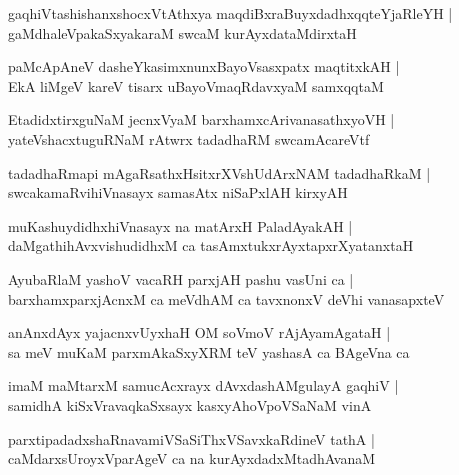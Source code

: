 \documentclass[twoside,12pt,openright]{book}
\newcounter{shloka}[chapter]
\begin{document}
\begin{shloka}%
gaqhiVtashishanxshocxVtAthxya maqdiBxraBuyxdadhxqqteYjaRleYH |\\
gaMdhaleVpakaSxyakaraM swcaM kurAyxdataMdirxtaH 
\end{shloka}

\begin{shloka}%
paMcApAneV dasheYkasimxnunxBayoVsasxpatx maqtitxkAH |\\
EkA liMgeV kareV tisarx uBayoVmaqRdavxyaM samxqqtaM 
\end{shloka}

\begin{shloka}%
EtadidxtirxguNaM jecnxVyaM barxhamxcArivanasathxyoVH |\\
yateVshacxtuguRNaM rAtwrx tadadhaRM swcamAcareVtf
\end{shloka}

\begin{shloka}%
tadadhaRmapi mAgaRsathxHsitxrXVshUdArxNAM tadadhaRkaM |\\
swcakamaRvihiVnasayx samasAtx niSaPxlAH kirxyAH 
\end{shloka}

\begin{shloka}%
muKashuydidhxhiVnasayx na matArxH PaladAyakAH |\\
daMgathihAvxvishudidhxM ca tasAmxtukxrAyxtapxrXyatanxtaH 
\end{shloka}

\begin{shloka}%
AyubaRlaM yashoV vacaRH parxjAH pashu vasUni ca |\\
barxhamxparxjAcnxM ca meVdhAM ca tavxnonxV deVhi vanasapxteV 
\end{shloka}

\begin{shloka}%
anAnxdAyx yajacnxvUyxhaH OM soVmoV rAjAyamAgataH |\\
sa meV muKaM parxmAkaSxyXRM teV yashasA ca BAgeVna ca 
\end{shloka}

\begin{shloka}%
imaM maMtarxM samucAcxrayx dAvxdashAMgulayA gaqhiV |\\
samidhA kiSxVravaqkaSxsayx kasxyAhoVpoVSaNaM vinA 
\end{shloka}

\begin{shloka}%
parxtipadadxshaRnavamiVSaSiThxVSavxkaRdineV tathA |\\
caMdarxsUroyxVparAgeV ca na kurAyxdadxMtadhAvanaM 
\end{shloka}
\end{document}
